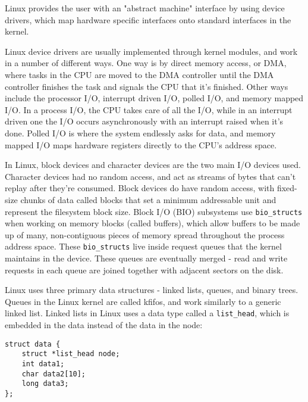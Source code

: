 \documentclass[10pt,draftclsnofoot,onecolumn,letterpaper]{IEEEtran}
\begin{document}
Linux provides the user with an "abstract machine" interface by using device drivers, which map hardware specific interfaces onto standard interfaces in the kernel\cite{1}. \par
Linux device drivers are usually implemented through kernel modules, and work in a number of different ways. One way is by direct memory access, or DMA, where tasks in the CPU are moved to the DMA controller until the DMA controller finishes the task and signals the CPU that it's finished. Other ways include the processor I/O, interrupt driven I/O, polled I/O, and memory mapped I/O\cite{1}. In a process I/O, the CPU takes care of all the I/O, while in an interrupt driven one the I/O occurs asynchronously with an interrupt raised when it's done. Polled I/O is where the system endlessly asks for data, and memory mapped I/O maps hardware registers directly to the CPU's address space\cite{1}. \par
In Linux, block devices and character devices are the two main I/O devices used. Character devices had no random access, and act as streams of bytes that can't replay after they're consumed. Block devices do have random access, with fixed-size chunks of data called blocks that set a minimum addressable unit and represent the filesystem block size\cite{1}. Block I/O (BIO) subsystems use \verb!bio_structs! when working on memory blocks (called buffers), which allow buffers to be made up of many, non-contiguous pieces of memory spread throughout the process address space. These \verb!bio_structs! live inside request queues that the kernel maintains in the device. These queues are eventually merged - read and write requests in each queue are joined together with adjacent sectors on the disk\cite{1}. \par
Linux uses three primary data structures - linked lists, queues, and binary trees. Queues in the Linux kernel are called kfifos, and work similarly to a generic linked list. Linked lists in Linux uses a data type called a \verb!list_head!, which is embedded in the data instead of the data in the node\cite{1}: \par

\begin{verbatim}
struct data {
	struct *list_head node;
	int data1;
	char data2[10];
	long data3;
};
\end{verbatim}
\end{document}
